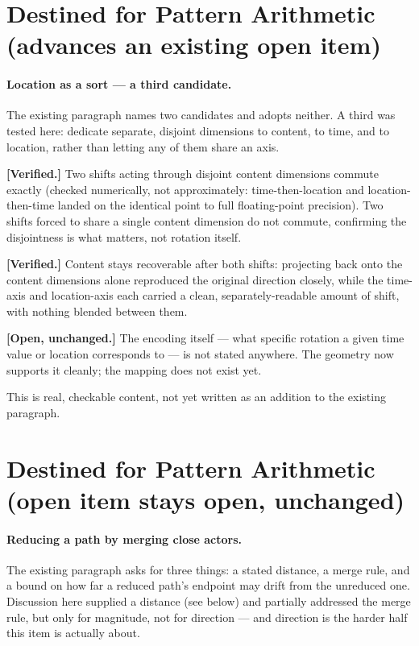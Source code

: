 \documentclass[11pt]{article}
\begin{document}
\section{Destined for Pattern Arithmetic (advances an existing open item)}

\paragraph{Location as a sort --- a third candidate.} The existing
paragraph names two candidates and adopts neither. A third was tested
here: dedicate separate, disjoint dimensions to content, to time, and
to location, rather than letting any of them share an axis.

\textbf{[Verified.]} Two shifts acting through disjoint content
dimensions commute exactly (checked numerically, not approximately:
time-then-location and location-then-time landed on the identical
point to full floating-point precision). Two shifts forced to share a
single content dimension do not commute, confirming the disjointness
is what matters, not rotation itself.

\textbf{[Verified.]} Content stays recoverable after both shifts:
projecting back onto the content dimensions alone reproduced the
original direction closely, while the time-axis and location-axis
each carried a clean, separately-readable amount of shift, with
nothing blended between them.

\textbf{[Open, unchanged.]} The encoding itself --- what specific
rotation a given time value or location corresponds to --- is not
stated anywhere. The geometry now supports it cleanly; the mapping
does not exist yet.

This is real, checkable content, not yet written as an addition to
the existing paragraph.

\section{Destined for Pattern Arithmetic (open item stays open, unchanged)}

\paragraph{Reducing a path by merging close actors.} The existing
paragraph asks for three things: a stated distance, a merge rule, and
a bound on how far a reduced path's endpoint may drift from the
unreduced one. Discussion here supplied a distance (see below) and
partially addressed the merge rule, but only for magnitude, not for
direction --- and direction is the harder half this item is actually
about.
\end{document}
